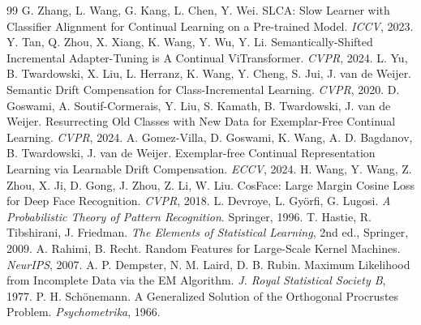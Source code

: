 \documentclass[11pt]{article}
\begin{document}
\begin{thebibliography}{99}
 G. Zhang, L. Wang, G. Kang, L. Chen, Y. Wei. SLCA: Slow Learner with Classifier Alignment for Continual
Learning on a Pre-trained Model. \emph{ICCV}, 2023.
 Y. Tan, Q. Zhou, X. Xiang, K. Wang, Y. Wu, Y. Li. Semantically-Shifted Incremental Adapter-Tuning is A
Continual ViTransformer. \emph{CVPR}, 2024.
 L. Yu, B. Twardowski, X. Liu, L. Herranz, K. Wang, Y. Cheng, S. Jui, J. van de Weijer. Semantic Drift
Compensation for Class-Incremental Learning. \emph{CVPR}, 2020.
 D. Goswami, A. Soutif-Cormerais, Y. Liu, S. Kamath, B. Twardowski, J. van de Weijer. Resurrecting Old
Classes with New Data for Exemplar-Free Continual Learning. \emph{CVPR}, 2024.
 A. Gomez-Villa, D. Goswami, K. Wang, A. D. Bagdanov, B. Twardowski, J. van de Weijer. Exemplar-free
Continual Representation Learning via Learnable Drift Compensation. \emph{ECCV}, 2024.
 H. Wang, Y. Wang, Z. Zhou, X. Ji, D. Gong, J. Zhou, Z. Li, W. Liu. CosFace: Large Margin Cosine Loss
for Deep Face Recognition. \emph{CVPR}, 2018.
 L. Devroye, L. Györfi, G. Lugosi. \emph{A Probabilistic Theory of Pattern Recognition}. Springer, 1996.
 T. Hastie, R. Tibshirani, J. Friedman. \emph{The Elements of Statistical Learning}, 2nd ed., Springer, 2009.
 A. Rahimi, B. Recht. Random Features for Large-Scale Kernel Machines. \emph{NeurIPS}, 2007.
 A. P. Dempster, N. M. Laird, D. B. Rubin. Maximum Likelihood from Incomplete Data via the EM Algorithm.
\emph{J. Royal Statistical Society B}, 1977.
 P. H. Schönemann. A Generalized Solution of the Orthogonal Procrustes Problem. \emph{Psychometrika},
1966.
\end{thebibliography}
\end{document}
